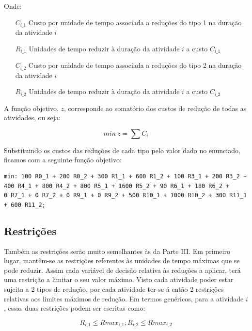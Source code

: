 Onde:

\begin{itemize}
	\item[$C_{i\_1}$] Custo por unidade de tempo associada a reduções do tipo 1 na duração da atividade $i$
	\item[$R_{i\_1}$] Unidades de tempo reduzir à duração da atividade $i$ a custo $C_{i\_1}$
	\item[$C_{i\_2}$] Custo por unidade de tempo associada a reduções do tipo 2 na duração da atividade $i$
	\item[$R_{i\_2}$] Unidades de tempo reduzir à duração da atividade $i$ a custo $C_{i\_2}$
\end{itemize}

A função objetivo, $z$, corresponde ao somatório dos custos de redução de todas as atividades, ou seja:

\begin{displaymath}
min~z = \sum C_i
\end{displaymath}

Substituindo os custos das reduções de cada tipo pelo valor dado no enunciado, ficamos com a seguinte função objetivo:

\begin{verbatim}
min: 100 R0_1 + 200 R0_2 + 300 R1_1 + 600 R1_2 + 100 R3_1 + 200 R3_2 + 
400 R4_1 + 800 R4_2 + 800 R5_1 + 1600 R5_2 + 90 R6_1 + 180 R6_2 + 
0 R7_1 + 0 R7_2 + 0 R9_1 + 0 R9_2 + 500 R10_1 + 1000 R10_2 + 300 R11_1 
+ 600 R11_2;
\end{verbatim}


\subsection{Restrições}

Também as restrições serão muito semelhantes às da Parte III.
Em primeiro lugar, mantêm-se as restrições referentes às unidades de tempo máximas que se pode reduzir. Assim cada variável de decisão relativa às reduções a aplicar, terá uma restrição a limitar o seu valor máximo. Visto cada atividade poder estar sujeita a 2 tipos de redução, por cada atividade ter-se-á então 2 restrições relativas aos limites máximos de redução. Em termos genéricos, para a atividade $i$, essas duas restrições podem ser escritas como:

\begin{displaymath}
R_{i\_1} \leq Rmax_{i\_1}; R_{i\_2} \leq Rmax_{i\_2}
\end{displaymath}

